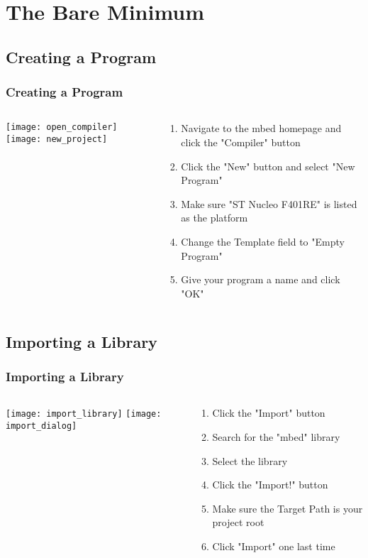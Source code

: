 \section{The Bare Minimum}
\label{sec:bare_minimum}

\subsection{Creating a Program}
\label{sub:creating_a_program}
\begin{frame}
	\frametitle{Creating a Program}
	\begin{columns}[T]
		\begin{column}{0.5\textwidth}
			\texttt{[image: open\_compiler]}
			\vspace{1ex}
			\texttt{[image: new\_project]}
		\end{column}
		\begin{column}{0.5\textwidth}
			\begin{enumerate}
				\item Navigate to the mbed homepage and click the "Compiler" button
				\item Click the "New" button and select "New Program"
				\item Make sure "ST Nucleo F401RE" is listed as the platform
				\item Change the Template field to "Empty Program"
				\item Give your program a name and click "OK"
			\end{enumerate}
		\end{column}
	\end{columns}
\end{frame}

\subsection{Importing a Library}
\label{sub:importing_a_library}
\begin{frame}
	\frametitle{Importing a Library}
	\begin{columns}[T]
		\begin{column}{0.5\textwidth}
			\texttt{[image: import\_library]}
			\vspace{1ex}
			\texttt{[image: import\_dialog]}
		\end{column}
		\begin{column}{0.5\textwidth}
			\begin{enumerate}
				\item Click the "Import" button
				\item Search for the "mbed" library
				\item Select the library
				\item Click the "Import!" button
				\item Make sure the Target Path is your project root
				\item Click "Import" one last time
			\end{enumerate}
		\end{column}
	\end{columns}
\end{frame}

